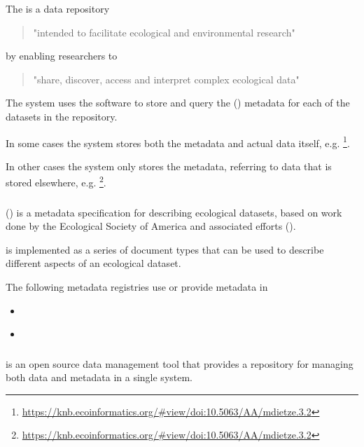 \documentclass{article}
\begin{document}
The  {\cite{knb}} is a data repository
\begin{quote}
"intended to facilitate ecological and environmental research"
\end{quote}
by enabling researchers to
\begin{quote}
"share, discover, access and interpret complex ecological data"
\end{quote}

The \cite{knb} system uses the \cite{metacat} software to store and query
the  (\cite{eml}) metadata for each of the datasets in the repository.

In some cases the \cite{knb} system stores both the metadata and actual
data itself, e.g.
\footnote{\url{https://knb.ecoinformatics.org/#view/doi:10.5063/AA/mdietze.3.2}}.

In other cases the \cite{knb} system only stores the metadata,
referring to data that is stored elsewhere, e.g.
\footnote{\url{https://knb.ecoinformatics.org/#view/doi:10.5063/AA/mdietze.3.2}}.


\subsubsection{}

 (\cite{eml}) is a metadata specification
for describing ecological datasets, based on work done by the
Ecological Society of America
and associated efforts
 (\cite{michener-1997}).

\cite{eml} is implemented as a series of \cite{format-xml} document types that can be
used to describe different aspects of an ecological dataset.

The following metadata registries use or provide metadata in \cite{eml}
\begin{itemize}
\item {} {\cite{knb}} 
\item {} {\cite{gbif}} 
\end{itemize}

\subsubsection{\cite{metacat}}

\cite{metacat} is an open source data management tool that provides a
repository for managing both data and metadata in a single system.
\end{document}
